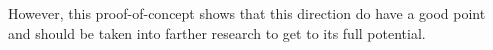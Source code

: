 \documentclass[20pt,margin=1in,innermargin=-4.5in,blockverticalspace=-0.25in]{tikzposter}
\begin{document}
\begin{columns}
{        However, this proof-of-concept shows that this direction do have a good point and should be taken into farther research to get to its full potential.
        }
                
\end{columns}
\end{document}
